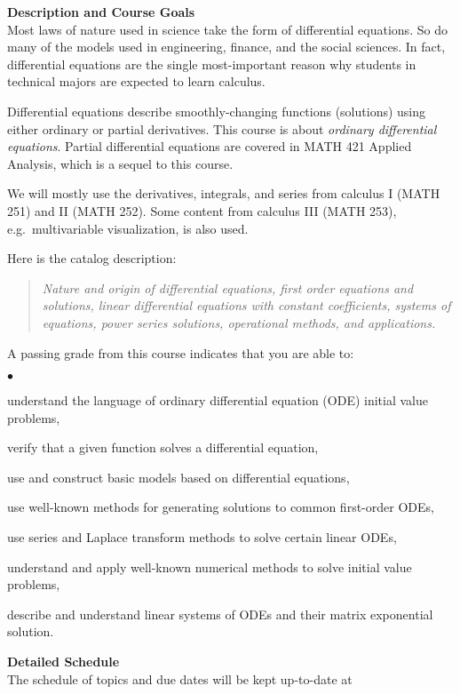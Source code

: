 \documentclass[12pt]{article}
\renewcommand{\emph}[1]{\textsf{\textbf{#1}}}
\newcommand{\localhead}[1]{\par\smallskip\textbf{#1}\nobreak\\}%
\def\heading#1{\localhead{\large\emph{#1}}}
\newenvironment{clist}%
{\bgroup\parskip 0pt\begin{list}{$\bullet$}{\partopsep 4pt\topsep 0pt\itemsep -2pt}}%
{\end{list}\egroup}%
\begin{document}
\vfill

\newpage
\cfoot{\thepage}
\strut

\heading{Description and Course Goals}
Most laws of nature used in science take the form of differential equations.  So do many of the models used in engineering, finance, and the social sciences.  In fact, differential equations are the single most-important reason why students in technical majors are expected to learn calculus.

Differential equations describe smoothly-changing functions (solutions) using either ordinary or partial derivatives.  This course is about \textsl{ordinary differential equations}.  Partial differential equations are covered in MATH 421 Applied Analysis, which is a sequel to this course.

We will mostly use the derivatives, integrals, and series from calculus I (MATH 251) and II (MATH 252).  Some content from calculus III (MATH 253), e.g.~multivariable visualization, is also used.

Here is the catalog description:
\begin{quote}
\textsl{Nature and origin of differential equations, first order equations and solutions, linear differential equations with constant coefficients, systems of equations, power series solutions, operational methods, and applications.}
\end{quote}

A passing grade from this course indicates that you are able to:

\begin{clist}
\item understand the language of ordinary differential equation (ODE) initial value problems,
\item verify that a given function solves a differential equation,
\item use and construct basic models based on differential equations,
\item use well-known methods for generating solutions to common first-order ODEs,
\item use series and Laplace transform methods to solve certain linear ODEs,
\item understand and apply well-known numerical methods to solve initial value problems,
\item describe and understand linear systems of ODEs and their matrix exponential solution.
\end{clist}


\heading{Detailed Schedule}
The schedule of topics and due dates will be kept up-to-date at
\end{document}
